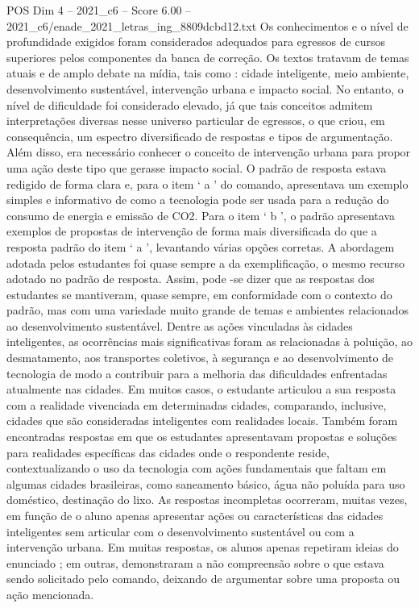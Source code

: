 \begin{textsample}{POS Dim 4 – 2021\_c6 – Score 6.00 – 2021\_c6/enade\_2021\_letras\_ing\_8809dcbd12.txt}
Os conhecimentos e o nível de profundidade exigidos foram considerados adequados para egressos de cursos superiores pelos componentes da banca de correção.
Os textos tratavam de temas atuais e de amplo debate na mídia, tais como : cidade inteligente, meio ambiente, desenvolvimento sustentável, intervenção urbana e impacto social.
No entanto, o nível de dificuldade foi considerado elevado, já que tais conceitos admitem interpretações diversas nesse universo particular de egressos, o que criou, em consequência, um espectro diversificado de respostas e tipos de argumentação.
Além disso, era necessário conhecer o conceito de intervenção urbana para propor uma ação deste tipo que gerasse impacto social.
O padrão de resposta estava redigido de forma clara e, para o item ‘ a ’ do comando, apresentava um exemplo simples e informativo de como a tecnologia pode ser usada para a redução do consumo de energia e emissão de CO2.
Para o item ‘ b ’, o padrão apresentava exemplos de propostas de intervenção de forma mais diversificada do que a resposta padrão do item ‘ a ’, levantando várias opções corretas.
A abordagem adotada pelos estudantes foi quase sempre a da exemplificação, o mesmo recurso adotado no padrão de resposta.
Assim, pode -se dizer que as respostas dos estudantes se mantiveram, quase sempre, em conformidade com o contexto do padrão, mas com uma variedade muito grande de temas e ambientes relacionados ao desenvolvimento sustentável.
Dentre as ações vinculadas às cidades inteligentes, as ocorrências mais significativas foram as relacionadas à poluição, ao desmatamento, aos transportes coletivos, à segurança e ao desenvolvimento de tecnologia de modo a contribuir para a melhoria das dificuldades enfrentadas atualmente nas cidades.
Em muitos casos, o estudante articulou a sua resposta com a realidade vivenciada em determinadas cidades, comparando, inclusive, cidades que são consideradas inteligentes com realidades locais.
Também foram encontradas respostas em que os estudantes apresentavam propostas e soluções para realidades específicas das cidades onde o respondente reside, contextualizando o uso da tecnologia com ações fundamentais que faltam em algumas cidades brasileiras, como saneamento básico, água não poluída para uso doméstico, destinação do lixo.
As respostas incompletas ocorreram, muitas vezes, em função de o aluno apenas apresentar ações ou características das cidades inteligentes sem articular com o desenvolvimento sustentável ou com a intervenção urbana.
Em muitas respostas, os alunos apenas repetiram ideias do enunciado ; em outras, demonstraram a não compreensão sobre o que estava sendo solicitado pelo comando, deixando de argumentar sobre uma proposta ou ação mencionada.

\end{textsample}
